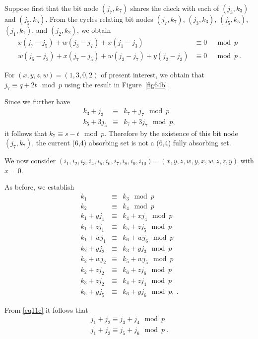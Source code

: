 {Suppose first that the bit node $(j_7,k_7)$ shares the check with
each of $(j_3,k_3)$ and $(j_5,k_5)$. From the cycles relating bit
nodes $(j_7,k_7)$, $(j_3,k_3)$, $(j_5,k_5)$, $(j_1,k_1)$, and
$(j_2,k_2)$, we obtain
\begin{eqnarray*}
x(j_7-j_5)+w(j_3-j_7)+x(j_1-j_3) &\equiv 0& \mod p\\
w(j_5-j_2)+x(j_7-j_5)+w(j_3-j_7)+y(j_2-j_3) &\equiv 0& \mod p~.
\end{eqnarray*}

For $(x,y,z,w)=(1,3,0,2)$ of present interest, we obtain that $j_7
\equiv q+2t \mod p$ using the result in Figure~\ref{fig64b}.

Since we further have
\begin{eqnarray*}
k_3+j_3 &\equiv & k_7+j_7 \mod p\\
k_5+3j_5 & \equiv & k_7 +3j_7 \mod p,
\end{eqnarray*}
it follows that $k_7 \equiv s-t \mod p$. Therefore by the
existence of this bit node $(j_7,k_7)$, the current (6,4)
absorbing set is not a (6,4) fully absorbing set.

 We now consider
$(i_1,i_2,i_3,i_4,i_5,i_6,i_7,i_8,i_9,i_{10})$=
$(x,y,z,w,y,x,w,z,z,y)$ with $x=0$. 

As before, we establish
\begin{equation}\label{eq11c}\begin{array}{cccc}
k_1 & \equiv & k_3 \mod p\\
k_2 & \equiv & k_4 \mod p\\
k_1+yj_1 & \equiv & k_4+xj_4 \mod p\\
k_1+zj_1 & \equiv & k_5+zj_5 \mod p\\
k_1+wj_1 & \equiv & k_6+wj_6 \mod p\\
k_2+yj_2 & \equiv & k_3+yj_3 \mod p\\
k_2+wj_2 & \equiv & k_5+wj_5 \mod p\\
k_2+zj_2 & \equiv & k_6+zj_6 \mod p\\
k_3+zj_2 & \equiv & k_4+zj_4 \mod p\\
k_5+yj_5 & \equiv & k_6+yj_6 \mod p,~.
\end{array}\end{equation}

From \ref{eq11c} it follows that
\begin{eqnarray}
j_1+j_2 \equiv j_3+j_4 \mod p\\
j_1+j_2 \equiv j_5+j_6 \mod p~.
\end{eqnarray}

}
